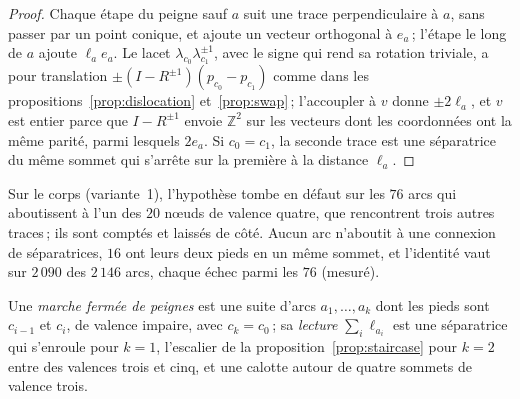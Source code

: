 \documentclass[11pt,a4paper]{article}
\newcommand{\Z}{\mathbb{Z}}
\begin{document}
\begin{proof}
Chaque étape du peigne sauf $a$ suit une trace perpendiculaire à $a$, sans
passer par un point conique, et ajoute un vecteur orthogonal à $e_a$\,;
l'étape le long de $a$ ajoute $\ell_a e_a$. Le lacet $\lambda_{c_0}
\lambda_{c_1}^{\pm1}$, avec le signe qui rend sa rotation triviale, a pour
translation $\pm(I - R^{\pm1})(p_{c_0} - p_{c_1})$ comme dans les
propositions~\ref{prop:dislocation} et~\ref{prop:swap}\,; l'accoupler à $v$
donne $\pm 2\ell_a$, et $v$ est entier parce que $I - R^{\pm1}$ envoie $\Z^2$
sur les vecteurs dont les coordonnées ont la même parité, parmi lesquels
$2e_a$. Si $c_0 = c_1$, la seconde trace est une séparatrice du même sommet
qui s'arrête sur la première à la distance $\ell_a$.
\end{proof}

Sur le corps (variante~1), l'hypothèse tombe en défaut sur les $76$ arcs qui
aboutissent à l'un des $20$ nœuds de valence quatre, que rencontrent trois
autres traces\,; ils sont comptés et laissés de côté. Aucun arc n'aboutit à
une connexion de séparatrices, $16$ ont leurs deux pieds en un même sommet, et
l'identité vaut sur $2\,090$ des $2\,146$ arcs, chaque échec parmi les $76$
(mesuré).

Une \emph{marche fermée de peignes} est une suite d'arcs $a_1, \dots, a_k$
dont les pieds sont $c_{i-1}$ et $c_i$, de valence impaire, avec $c_k =
c_0$\,; sa \emph{lecture} $\sum_i \ell_{a_i}$ est une séparatrice qui
s'enroule pour $k = 1$, l'escalier de la proposition~\ref{prop:staircase} pour
$k = 2$ entre des valences trois et cinq, et une calotte autour de quatre
sommets de valence trois.
\end{document}
